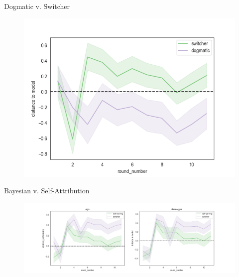 \documentclass[aspectratio=169]{beamer}
\begin{document}
\begin{frame}{Dogmatic v. Switcher}
    \label{pathdistances}
    \begin{figure}
        \centering
        \includegraphics[scale=.5]{distances_switch_dog.png}
    \end{figure}
\end{frame}

\begin{frame}{Bayesian v. Self-Attribution}
    \begin{figure}
        \centering
        \includegraphics[scale=.5]{distances_bay_ss.png}
    \end{figure}
\end{frame}
\end{document}
